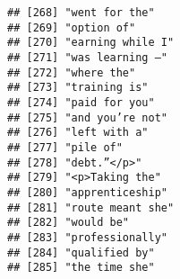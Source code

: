 \documentclass[]{article}
\begin{document}
\begin{verbatim}
## [268] "went for the"                                                                                                                             
## [269] "option of"                                                                                                                                
## [270] "earning while I"                                                                                                                          
## [271] "was learning –"                                                                                                                           
## [272] "where the"                                                                                                                                
## [273] "training is"                                                                                                                              
## [274] "paid for you"                                                                                                                             
## [275] "and you’re not"                                                                                                                           
## [276] "left with a"                                                                                                                              
## [277] "pile of"                                                                                                                                  
## [278] "debt.”</p>"                                                                                                                               
## [279] "<p>Taking the"                                                                                                                            
## [280] "apprenticeship"                                                                                                                           
## [281] "route meant she"                                                                                                                          
## [282] "would be"                                                                                                                                 
## [283] "professionally"                                                                                                                           
## [284] "qualified by"                                                                                                                             
## [285] "the time she"                                                                                                                             

\end{verbatim}
\end{document}
